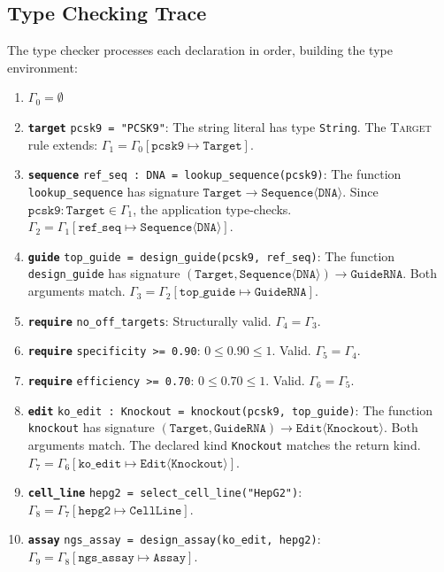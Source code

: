 \documentclass[12pt,a4paper]{article}
\newcommand{\ty}[1]{\texttt{#1}}
\newcommand{\kw}[1]{\textbf{\texttt{#1}}}
\begin{document}
\subsection{Type Checking Trace}

The type checker processes each declaration in order, building the type environment:

\begin{enumerate}
    \item $\Gamma_0 = \emptyset$
    \item \kw{target} \texttt{pcsk9 = "PCSK9"}: The string literal has type \ty{String}. The \textsc{Target} rule extends: $\Gamma_1 = \Gamma_0[\texttt{pcsk9} \mapsto \ty{Target}]$.
    \item \kw{sequence} \texttt{ref\_seq : DNA = lookup\_sequence(pcsk9)}: The function \texttt{lookup\_sequence} has signature $\ty{Target} \to \ty{Sequence}\langle\ty{DNA}\rangle$. Since $\texttt{pcsk9} : \ty{Target} \in \Gamma_1$, the application type-checks. $\Gamma_2 = \Gamma_1[\texttt{ref\_seq} \mapsto \ty{Sequence}\langle\ty{DNA}\rangle]$.
    \item \kw{guide} \texttt{top\_guide = design\_guide(pcsk9, ref\_seq)}: The function \texttt{design\_guide} has signature $(\ty{Target}, \ty{Sequence}\langle\ty{DNA}\rangle) \to \ty{GuideRNA}$. Both arguments match. $\Gamma_3 = \Gamma_2[\texttt{top\_guide} \mapsto \ty{GuideRNA}]$.
    \item \kw{require} \texttt{no\_off\_targets}: Structurally valid. $\Gamma_4 = \Gamma_3$.
    \item \kw{require} \texttt{specificity >= 0.90}: $0 \leq 0.90 \leq 1$. Valid. $\Gamma_5 = \Gamma_4$.
    \item \kw{require} \texttt{efficiency >= 0.70}: $0 \leq 0.70 \leq 1$. Valid. $\Gamma_6 = \Gamma_5$.
    \item \kw{edit} \texttt{ko\_edit : Knockout = knockout(pcsk9, top\_guide)}: The function \texttt{knockout} has signature $(\ty{Target}, \ty{GuideRNA}) \to \ty{Edit}\langle\ty{Knockout}\rangle$. Both arguments match. The declared kind \ty{Knockout} matches the return kind. $\Gamma_7 = \Gamma_6[\texttt{ko\_edit} \mapsto \ty{Edit}\langle\ty{Knockout}\rangle]$.
    \item \kw{cell\_line} \texttt{hepg2 = select\_cell\_line("HepG2")}: $\Gamma_8 = \Gamma_7[\texttt{hepg2} \mapsto \ty{CellLine}]$.
    \item \kw{assay} \texttt{ngs\_assay = design\_assay(ko\_edit, hepg2)}: $\Gamma_9 = \Gamma_8[\texttt{ngs\_assay} \mapsto \ty{Assay}]$.
\end{enumerate}
\end{document}
